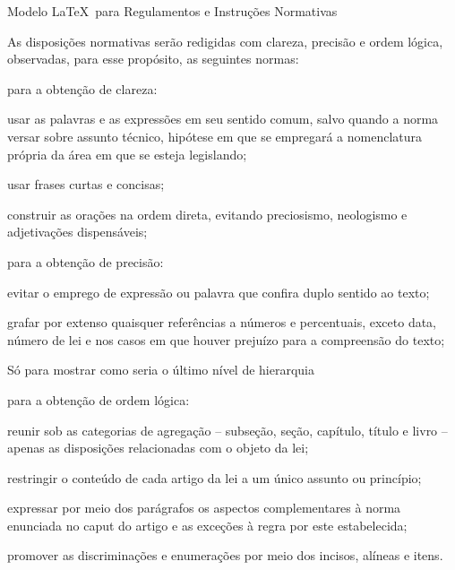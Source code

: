 \documentclass[11pt,twoside,a4paper]{inifsc}
\begin{document}
\begin{normativa}{Modelo \LaTeX~para Regulamentos e Instruções Normativas}
\begin{artigo}
    \item As disposições normativas serão redigidas com clareza, precisão e ordem lógica, observadas, para esse propósito, as seguintes normas: 
    \begin{inciso}
        \item para a obtenção de clareza:
        \begin{inciso}
            \item usar as palavras e as expressões em seu sentido comum, salvo quando a norma versar sobre assunto técnico, hipótese em que se empregará a nomenclatura própria da área em que se esteja legislando;
            \item usar frases curtas e concisas;
            \item construir as orações na ordem direta, evitando preciosismo, neologismo e adjetivações dispensáveis;
        \end{inciso}
        \item para a obtenção de precisão:
        \begin{inciso}
            \item evitar o emprego de expressão ou palavra que confira duplo sentido ao texto;
            \item grafar por extenso quaisquer referências a números e percentuais, exceto data, número de lei e nos casos em que houver prejuízo para a compreensão do texto; 
            \begin{inciso}
                \item Só para mostrar como seria o último nível de hierarquia
            \end{inciso}
        \end{inciso}
        \item para a obtenção de ordem lógica:
        \begin{inciso}
            \item reunir sob as categorias de agregação -- subseção, seção, capítulo, título e livro -- apenas as disposições relacionadas com o objeto da lei;
            \item restringir o conteúdo de cada artigo da lei a um único assunto ou princípio;
            \item expressar por meio dos parágrafos os aspectos complementares à norma enunciada no caput do artigo e as exceções à regra por este estabelecida;
            \item promover as discriminações e enumerações por meio dos incisos, alíneas e itens.
        \end{inciso}
    \end{inciso}
\end{artigo}




\end{normativa}
\end{document}
